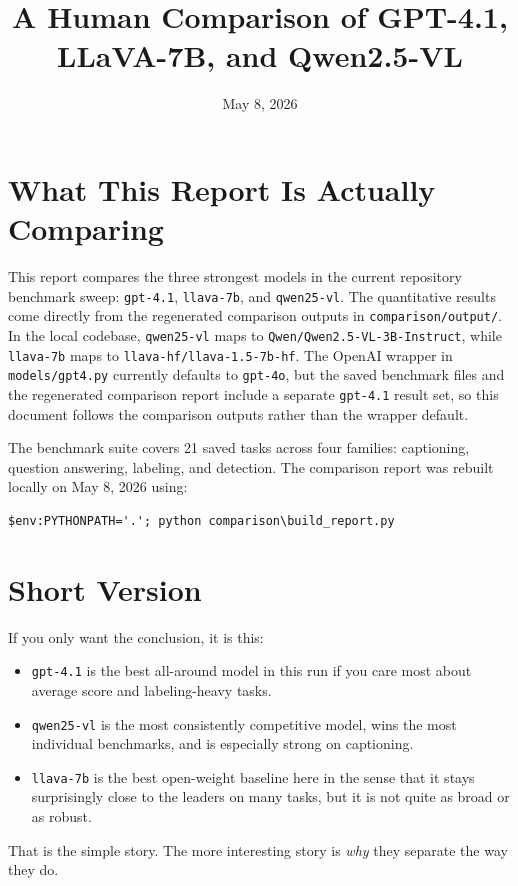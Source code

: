 \documentclass[11pt]{article}
\title{A Human Comparison of GPT-4.1, LLaVA-7B, and Qwen2.5-VL}
\author{}
\date{May 8, 2026}
\begin{document}
\maketitle

\section{What This Report Is Actually Comparing}
This report compares the three strongest models in the current repository benchmark sweep:
\texttt{gpt-4.1}, \texttt{llava-7b}, and \texttt{qwen25-vl}. The quantitative results come directly from the regenerated comparison outputs in \texttt{comparison/output/}. In the local codebase, \texttt{qwen25-vl} maps to \texttt{Qwen/Qwen2.5-VL-3B-Instruct}, while \texttt{llava-7b} maps to \texttt{llava-hf/llava-1.5-7b-hf}. The OpenAI wrapper in \texttt{models/gpt4.py} currently defaults to \texttt{gpt-4o}, but the saved benchmark files and the regenerated comparison report include a separate \texttt{gpt-4.1} result set, so this document follows the comparison outputs rather than the wrapper default.

The benchmark suite covers 21 saved tasks across four families:
captioning, question answering, labeling, and detection. The comparison report was rebuilt locally on May 8, 2026 using:

\begin{verbatim}
$env:PYTHONPATH='.'; python comparison\build_report.py
\end{verbatim}

\section{Short Version}
If you only want the conclusion, it is this:
\begin{itemize}[leftmargin=*]
    \item \texttt{gpt-4.1} is the best all-around model in this run if you care most about average score and labeling-heavy tasks.
    \item \texttt{qwen25-vl} is the most consistently competitive model, wins the most individual benchmarks, and is especially strong on captioning.
    \item \texttt{llava-7b} is the best open-weight baseline here in the sense that it stays surprisingly close to the leaders on many tasks, but it is not quite as broad or as robust.
\end{itemize}

That is the simple story. The more interesting story is \emph{why} they separate the way they do.
\end{document}
